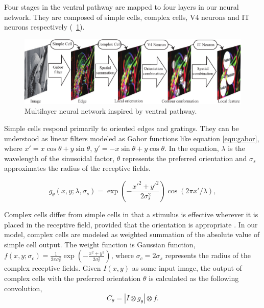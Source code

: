\documentclass{ecai2014}
\begin{document}
Four stages in the ventral pathway are mapped to four layers in our neural network.
They are composed of simple cells, complex cells, V4 neurons and IT neurons respectively 
(\figurename~\ref{fig:model}). 

\begin{figure}[h]
\centering
\includegraphics[width=0.98\linewidth]{images/fig1.pdf}
\caption{Multilayer neural network inspired by ventral pathway.}
\label{fig:model}
\end{figure}


Simple cells \cite{Hubel1962} respond primarily to oriented edges and gratings.
They can be understood as linear filters modeled as Gabor functions \cite{Gabor1946}
like equation \ref{equ:gabor},
where $x'=x\cos\theta+y\sin\theta$, $y'=-x\sin\theta+y\cos\theta$.
In the equation, $\lambda$ is the wavelength of the sinusoidal factor, 
$\theta$ represents the preferred orientation and 
$\sigma_s$ approximates the radius of the receptive fields.

\begin{equation}\label{equ:gabor}
g_{\theta}(x,y;\lambda,\sigma_s)
=\exp\left(-\frac{x'^2+y'^2}{2\sigma_s^2}\right)
\cos(2\pi x'/\lambda),
\end{equation}

Complex cells differ from simple cells in that a stimulus is effective wherever it is placed 
in the receptive field, provided that the orientation is appropriate \cite{Hubel1962}. 
In our model, complex cells are modeled as weighted summation of the absolute value of simple cell output.
The weight function is Gaussian function, 
$f(x,y;\sigma_c)=\frac{1}{2\pi\sigma_c^2}\exp\left(-\frac{x^2+y^2}{2\sigma_c^2}\right)$,
where $\sigma_c=2\sigma_s$ represents the radius of the complex receptive fields.
Given $I(x,y)$ as some input image, 
the output of complex cells
with the preferred orientation $\theta$
is calculated as the following convolution,
\begin{equation}
C_{\theta}=|I\otimes g_{\theta}|\otimes f.
\label{equ:complex}
\end{equation}
\end{document}

